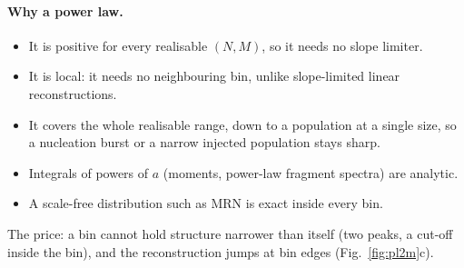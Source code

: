 \documentclass[11pt,a4paper]{article}
\begin{document}
\paragraph{Why a power law.}
\begin{itemize}
\item It is positive for every realisable $(N, M)$, so it needs no slope limiter.
\item It is local: it needs no neighbouring bin, unlike slope-limited linear reconstructions.
\item It covers the whole realisable range, down to a population at a single size, so a nucleation burst or a
  narrow injected population stays sharp.
\item Integrals of powers of $a$ (moments, power-law fragment spectra) are analytic.
\item A scale-free distribution such as MRN is exact inside every bin.
\end{itemize}
The price: a bin cannot hold structure narrower than itself (two peaks, a cut-off inside the bin), and the
reconstruction jumps at bin edges (Fig.~\ref{fig:pl2m}c).
\end{document}
